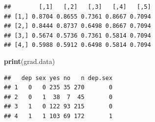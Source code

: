 \documentclass[
  11pt,
]{article}
\newenvironment{Shaded}{\begin{snugshade}}{\end{snugshade}}
\newcommand{\FunctionTok}[1]{\textcolor[rgb]{0.13,0.29,0.53}{\textbf{#1}}}
\newcommand{\NormalTok}[1]{#1}
\begin{document}
\begin{verbatim}
##        [,1]   [,2]   [,3]   [,4]   [,5]
## [1,] 0.8704 0.8655 0.7361 0.8667 0.7094
## [2,] 0.8444 0.8737 0.6498 0.8667 0.7094
## [3,] 0.5674 0.5736 0.7361 0.5814 0.7094
## [4,] 0.5988 0.5912 0.6498 0.5814 0.7094
\end{verbatim}

\begin{Shaded}
\begin{Highlighting}[]
\FunctionTok{print}\NormalTok{(grad.data)}
\end{Highlighting}
\end{Shaded}

\begin{verbatim}
##   dep sex yes no   n dep.sex
## 1   0   0 235 35 270       0
## 2   0   1  38  7  45       0
## 3   1   0 122 93 215       0
## 4   1   1 103 69 172       1
\end{verbatim}
\end{document}
